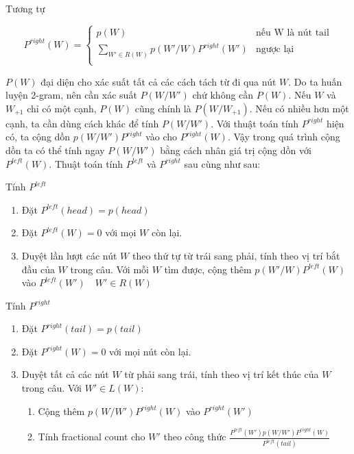 \documentclass[a4paper,oneside,14pt]{extbook} %
\begin{document}
Tương tự

$$
P^{right}(W) = \left\{
    \begin{array}{ll}
      p(W)&\text{nếu W là nút tail}\\
      \displaystyle\sum_{W' \in R(W)}p(W'/W)P^{right}(W')&\text{ngược lại}\\
    \end{array}
  \right.
$$

$P(W)$ đại diện cho xác suất tất cả các cách tách từ đi qua nút
$W$. Do ta huấn luyện 2-gram, nên cần xác suất $P(W/W')$ chứ không cần
$P(W)$. Nếu $W$ và $W_{+1}$ chỉ có một cạnh, $P(W)$ cũng chính là
$P(W/W_{+1})$. Nếu có nhiều hơn một cạnh, ta cần dùng cách khác để
tính $P(W/W')$. Với thuật toán tính $P^{right}$ hiện có, ta cộng dồn
$p(W/W')P^{right}$ vào cho $P^{right}(W)$. Vậy trong quá trình cộng
dồn ta có thể tính ngay $P(W/W')$ bằng cách nhân giá trị cộng dồn với
$P^{left}(W)$. Thuật toán tính $P^{left}$ và $P^{right}$ sau cùng như
sau:

\begin{algo}\caption{Tính $P^{left}$}
\begin{enumerate}
\item Đặt $P^{left}(head) = p(head)$
\item Đặt $P^{left}(W) = 0$ với mọi $W$ còn lại.
\item Duyệt lần lượt các nút $W$ theo thứ tự từ trái sang phải, tính
  theo vị trí bắt đầu của $W$ trong câu.
  Với mỗi $W$ tìm được, cộng thêm $p(W'/W)P^{left}(W)$ vào $P^{left}(W')\quad
  W' \in R(W)$
\end{enumerate}
\end{algo}

\begin{algo}\caption{Tính $P^{right}$}
\begin{enumerate}
\item Đặt $P^{right}(tail) = p(tail)$
\item Đặt $P^{right}(W) = 0$ với mọi nút còn lại.
\item Duyệt tất cả các nút $W$ từ phải sang trái, tính theo vị trí kết
  thúc của $W$ trong câu. Với $W' \in L(W)$:
  \begin{enumerate}
  \item Cộng thêm $p(W/W')P^{right}(W)$ vào $P^{right}(W')$
  \item Tính fractional count cho $W'$ theo công thức
    $\displaystyle\frac{P^{left}(W')p(W/W')P^{right}(W)}{P^{left}(tail)}$
  \end{enumerate}
\end{enumerate}
\end{algo}
\end{document}
